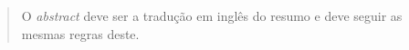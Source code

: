 \begin{abstract}

\noindent
O \emph{abstract} deve ser a tradução em inglês do resumo e deve seguir as mesmas regras deste.

\end{abstract}
